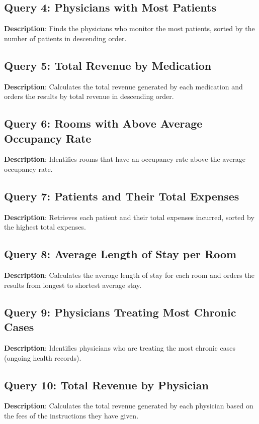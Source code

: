 \documentclass[a4paper,11pt]{article}
\theoremstyle{mytheor}
\begin{document}
\subsection{Query 4: Physicians with Most Patients}

\textbf{Description}: Finds the physicians who monitor the most patients, sorted by the number of patients in descending order.

\subsection{Query 5: Total Revenue by Medication}

\textbf{Description}: Calculates the total revenue generated by each medication and orders the results by total revenue in descending order.

\subsection{Query 6: Rooms with Above Average Occupancy Rate}

\textbf{Description}: Identifies rooms that have an occupancy rate above the average occupancy rate.

\subsection{Query 7: Patients and Their Total Expenses}

\textbf{Description}: Retrieves each patient and their total expenses incurred, sorted by the highest total expenses.

\subsection{Query 8: Average Length of Stay per Room}

\textbf{Description}: Calculates the average length of stay for each room and orders the results from longest to shortest average stay.

\subsection{Query 9: Physicians Treating Most Chronic Cases}

\textbf{Description}: Identifies physicians who are treating the most chronic cases (ongoing health records).

\subsection{Query 10: Total Revenue by Physician}

\textbf{Description}: Calculates the total revenue generated by each physician based on the fees of the instructions they have given.
\end{document}
